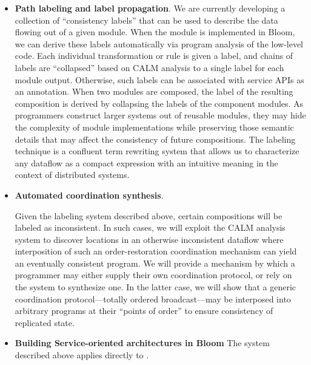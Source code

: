 \begin{itemize}
\item \textbf{Path labeling and label propagation}.
We are currently developing a collection of ``consistency labels'' that 
can be used to describe the data flowing out of a given module.  When the module
is implemented in Bloom, we can derive these labels automatically via program
analysis of the low-level code.  Each individual transformation or rule is 
given a label, and chains of labels are ``collapsed'' based on CALM analysis to 
a single label for each module output.  
Otherwise, such labels can be associated with service APIs as an annotation.  
When two modules are composed, the label of the resulting composition is derived
by collapsing the labels of the component modules.
As programmers construct larger systems out of reusable modules, they may 
hide the complexity of module implementations while preserving those semantic 
details that may affect the consistency of future compositions. The 
labeling technique is a confluent term rewriting system that allows us to 
characterize any dataflow as a compact expression with an intuitive 
meaning in the context of distributed systems.

\item \textbf{Automated coordination synthesis}.

Given the labeling system described above, certain compositions will be 
labeled as inconsistent.  In such cases, we will exploit the CALM
analysis system to discover locations in an otherwise 
inconsistent dataflow where interposition of such an order-restoration 
coordination mechanism can yield an eventually consistent program.
We will provide a mechanism by which a programmer may either supply 
their own coordination protocol, or rely on the system to synthesize one. 
In the latter case, we will show that a generic coordination 
protocol---totally ordered broadcast---may be interposed into arbitrary 
programs at their ``points of order''
to ensure consistency of replicated state.

\item \textbf{Building Service-oriented architectures in Bloom}
The system described above applies directly to .
\end{itemize}

